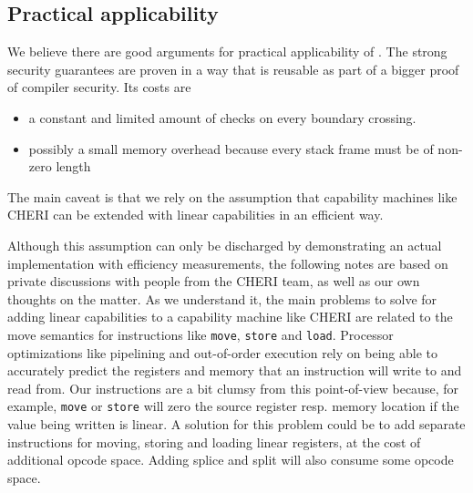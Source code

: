 \documentclass[acmsmall,review,anonymous]{acmart}\settopmatter{printfolios=true,printccs=false,printacmref=false}
\newcommand{\trgcm}{\textsc{LCM}}
\newcommand{\srccm}{\textsc{oLCM}}
\begin{document}

\subsection{Practical applicability}
We believe there are good arguments for practical applicability of \stktokens{}.
The strong security guarantees are proven in a way that is reusable as part of a bigger proof of compiler security.
Its costs are
\begin{itemize}
\item a constant and limited amount of checks on every boundary crossing.
\item possibly a small memory overhead because every stack frame must be of non-zero length
\end{itemize}
The main caveat is that we rely on the assumption that capability machines like CHERI can be extended with linear capabilities in an efficient way.

Although this assumption can only be discharged by demonstrating an actual implementation with efficiency measurements, the following notes are based on private discussions with people from the CHERI team, as well as our own thoughts on the matter.
As we understand it, the main problems to solve for adding linear capabilities to a capability machine like CHERI are related to the move semantics for instructions like \texttt{move}, \texttt{store} and \texttt{load}.
Processor optimizations like pipelining and out-of-order execution rely on being able to accurately predict the registers and memory that an instruction will write to and read from.
Our instructions are a bit clumsy from this point-of-view because, for example, \texttt{move} or \texttt{store} will zero the source register resp. memory location if the value being written is linear.
A solution for this problem could be to add separate instructions for moving, storing and loading linear registers, at the cost of additional opcode space.
Adding splice and split will also consume some opcode space.
\end{document}
